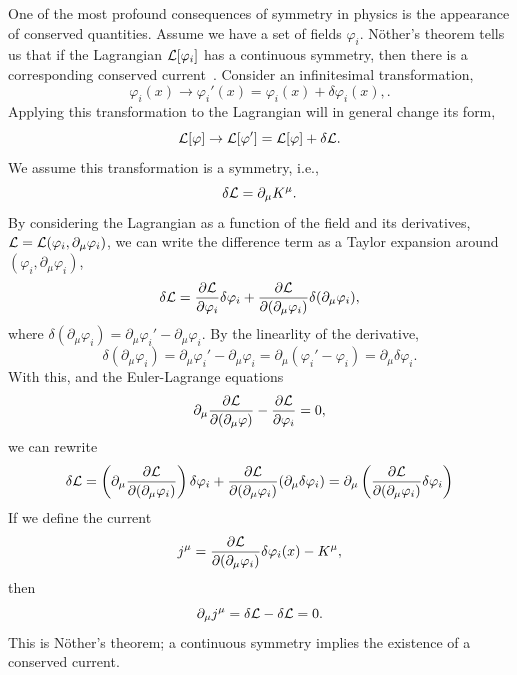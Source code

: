 One of the most profound consequences of symmetry in physics is the appearance of conserved quantities.
Assume we have a set of fields $\varphi_i$. Nöther's theorem tells us that if the Lagrangian $\mathcal{L}[\varphi_i]$ has a continuous symmetry, then there is a corresponding conserved current~\cite{Peskin:IntroQFT,Carroll:space-time}.
Consider an infinitesimal transformation,
\begin{equation}
    \varphi_i(x) \longrightarrow \varphi_i'(x)
    = \varphi_i(x) + \delta \varphi_i(x),.
\end{equation}
%
Applying this transformation to the Lagrangian will in general change its form,
\begin{equation}
    \mathcal{L}[\varphi] \rightarrow \mathcal{L}[\varphi']
    = \mathcal{L}[\varphi] + \delta \mathcal{L}.
\end{equation}
%
We assume this transformation is a symmetry, i.e.,
\begin{equation*}
    \delta \mathcal{L} = \partial_\mu K^\mu.
\end{equation*}
%
By considering the Lagrangian as a function of the field and its derivatives, $\mathcal{L} = \mathcal{L}(\varphi_i, \partial_\mu \varphi_i)$, we can write the difference term as a Taylor expansion around $(\varphi_i, \partial_\mu \varphi_i)$,
\begin{align}
    \delta \Ell
    = \diffp{\Ell}{\varphi_i} \delta \varphi_i
    + \diffp{\Ell}{(\partial_\mu \varphi_i)} \delta (\partial_\mu \varphi_i),
\end{align}
%
where $\delta (\partial_\mu \varphi_i) = \partial_\mu \varphi_i' - \partial_\mu \varphi_i$.
By the linearlity of the derivative,
\begin{equation}
    \delta (\partial_\mu \varphi_i)
    = \partial_\mu \varphi_i' - \partial_\mu \varphi_i
    = \partial_\mu (\varphi_i' - \varphi_i)
    = \partial_\mu \delta \varphi_i.
\end{equation}
%
With this, and the Euler-Lagrange equations
\begin{equation}
    \partial_\mu \diffp{\Ell}{(\partial_\mu \varphi)} - \diffp{\Ell}{\varphi_i} = 0,
\end{equation}
%
we can rewrite
\begin{equation}
    \delta \Ell = \left( \partial_\mu \diffp{\Ell}{(\partial_\mu \varphi_i)} \right) \delta \varphi_i
    + \diffp{\Ell}{(\partial_\mu \varphi_i)} (\partial_\mu \delta \varphi_i)
    = \partial_\mu \left(\diffp{\Ell}{(\partial_\mu \varphi_i)} \delta \varphi_i\right)
\end{equation}
%
If we define the current
\begin{equation}
    j^\mu = \pdv{\mathcal{L}}{(\partial_\mu \varphi_i)} \delta \varphi_i(x) - K^\mu,
\end{equation}
%
then 
\begin{equation}
    \partial_\mu j^\mu = \delta \mathcal{L} - \delta \mathcal{L} = 0.
\end{equation}
%
This is Nöther's theorem; a continuous symmetry implies the existence of a conserved current.

